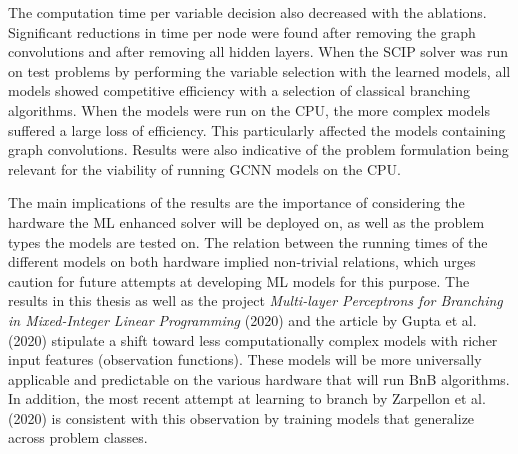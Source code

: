 The computation time per variable decision also decreased with the ablations. Significant reductions in time per node were found after removing the graph convolutions and after removing all hidden layers. When the \gls{SCIP} solver was run on test problems by performing the variable selection with the learned models, all models showed competitive efficiency with a selection of classical branching algorithms. When the models were run on the \gls{CPU}, the more complex models suffered a large loss of efficiency. This particularly affected the models containing graph convolutions. Results were also indicative of the problem formulation being relevant for the viability of running \gls{GCNN} models on the \gls{CPU}. 

The main implications of the results are the importance of considering the hardware the \gls{ML} enhanced solver will be deployed on, as well as the problem types the models are tested on. The relation between the running times of the different models on both hardware implied non-trivial relations, which urges caution for future attempts at developing \gls{ML} models for this purpose. The results in this thesis as well as the project \textit{Multi-layer Perceptrons for Branching in Mixed-Integer Linear Programming} (2020) and the article by Gupta et al. (2020) \cite{gupta2020hybrid} stipulate a shift toward less computationally complex models with richer input features (observation functions). These models will be more universally applicable and predictable on the various hardware that will run \gls{BnB} algorithms. In addition, the most recent attempt at learning to branch by Zarpellon et al. (2020) \cite{zarpellon2020parameterizing} is consistent with this observation by training models that generalize across problem classes.

